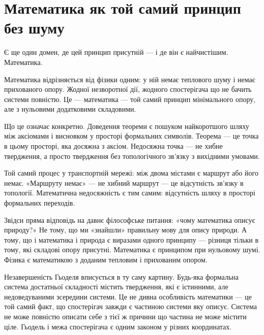 \documentclass[12pt, a4paper, openany]{book}
\begin{document}
\section{Математика як той самий принцип без шуму}

Є ще один домен, де цей принцип присутній --- і де він є найчистішим. Математика.

Математика відрізняється від фізики одним: у ній немає теплового шуму і немає прихованого опору. Жодної незворотної дії, жодного спостерігача що не бачить системи повністю. Це — математика --- той самий принцип мінімального опору, але з нульовими додатковими складовими.

Що це означає конкретно. Доведення теореми є пошуком найкоротшого шляху між аксіомами і висновком у просторі формальних символів. Теорема --- це точка в цьому просторі, яка досяжна з аксіом. Недосяжна точка --- не хибне твердження, а просто твердження без топологічного зв'язку з вихідними умовами.

\begin{analogybox}
Той самий процес у транспортній мережі: між двома містами є маршрут або його немає. «Маршруту немає» — не хибний маршрут --- це відсутність зв'язку в топології. Математична недосяжність є тим самим: відсутність шляху в просторі формальних переходів.
\end{analogybox}

Звідси пряма відповідь на давнє філософське питання: «чому математика описує природу?» Не тому, що ми «знайшли» правильну мову для опису природи. А тому, що і математика і природа є виразами одного принципу --- різниця тільки в тому, які складові опору присутні. Математика є принципом при нульовому шумі. Фізика є математикою з доданим тепловим і прихованим опором.

Незавершеність Гьоделя вписується в ту саму картину. Будь-яка формальна система достатньої складності містить твердження, які є істинними, але недоведуваними зсередини системи. Це не дивна особливість математики --- це той самий факт, що спостерігач завжди є частиною системи яку описує. Система не може повністю описати себе з тієї ж причини що частина не може містити ціле. Гьодель і межа спостерігача є одним законом у різних координатах.
\end{document}
